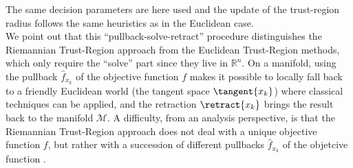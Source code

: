 The same decision parameters are here used and the update of the trust-region radius follows the same heuristics as in the Euclidean case. \\ 
We point out that this “pullback-solve-retract” procedure distinguishes the Riemannian Trust-Region approach from the Euclidean Trust-Region methods, which only require the “solve” part since they live in $\mathbb{R}^n$. On a manifold, using the pullback $\hat{f}_{x_k}$ of the objective function $f$ makes it possible to locally fall back to a friendly Euclidean world (the tangent space $\tangent{x_k}$) where classical techniques can be applied, and the retraction $\retract{x_k}$ brings the result back to the manifold $\mathcal{M}$. A difficulty, from an analysis perspective, is that the Riemannian Trust-Region approach does not deal with a unique objective function $f$,
but rather with a succession of different pullbacks $\hat{f}_{x_k}$ of the objetcive function \cite[p.~305]{AbsilBakerGallivan:2007}. \\


